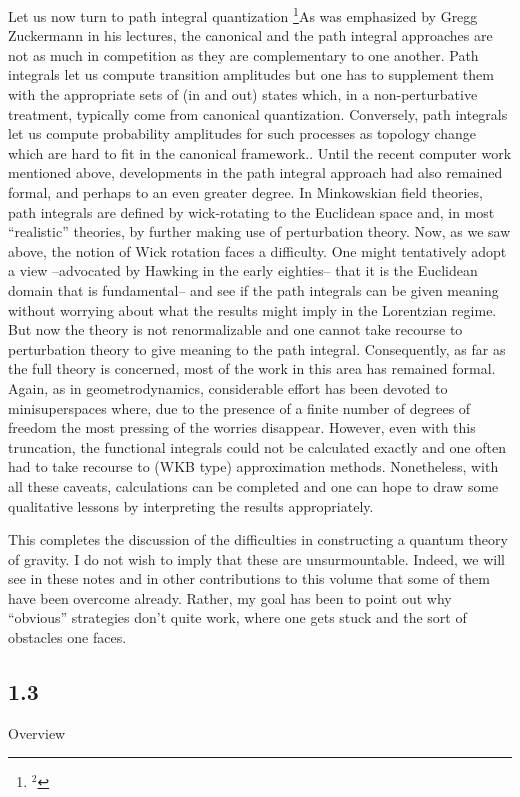 Let us now turn to path integral quantization%
\footnote{$^2$}{As was emphasized by Gregg Zuckermann in his lectures, the
canonical and the path integral approaches are not as much in competition
as they are complementary to one another. Path integrals let us compute
transition amplitudes but one has to supplement them with the appropriate
sets of (in and out) states which, in a non-perturbative treatment,
typically come from canonical quantization. Conversely, path integrals let
us compute probability amplitudes for such processes as topology change
which are hard to fit in the canonical framework.}.
Until the recent computer work mentioned above, developments in the path
integral approach had also remained formal,
and perhaps to an even greater degree. In Minkowskian field theories,
path integrals are defined by wick-rotating to the Euclidean space and,
in most ``realistic'' theories, by further making use of perturbation theory.
Now, as we saw above, the notion of Wick rotation faces a difficulty. One
might tentatively adopt a view --advocated by Hawking in the early eighties--
that it is the Euclidean domain that is fundamental-- and see if the path
integrals can be given meaning without worrying about what the results might
imply in the Lorentzian regime. But now the theory is not renormalizable
and one cannot take recourse to  perturbation theory to give meaning to
the path integral. Consequently, as far as the full theory is concerned, most
of the work in this area has remained formal. Again, as in geometrodynamics,
considerable effort has been devoted to minisuperspaces where, due to the
presence of a finite number of degrees of freedom the most pressing of the
worries disappear. However, even with this truncation, the functional
integrals could not be calculated exactly and one often had to take recourse
to (WKB type) approximation methods. Nonetheless, with all these caveats,
calculations can be completed and one can hope to draw some qualitative
lessons by interpreting the results appropriately.
\medskip

This completes the discussion of the difficulties in constructing a quantum
theory of gravity. I do not wish to imply that these are unsurmountable.
Indeed, we will see in these notes and in other contributions to this volume
that some of them have been overcome already. Rather, my goal has been to
point out why ``obvious'' strategies don't quite work, where one gets stuck
and the sort of obstacles one faces.

\goodbreak
\subsection{1.3}{Overview}

